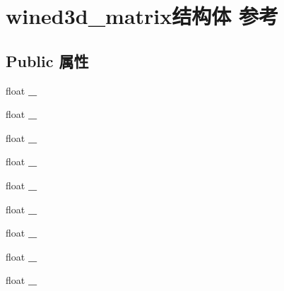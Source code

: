 \hypertarget{structwined3d__matrix}{}\section{wined3d\+\_\+matrix结构体 参考}
\label{structwined3d__matrix}
\subsection*{Public 属性}
\begin{DoxyCompactItemize}
\item 
\mbox{\label{structwined3d__matrix_a9b6db28f15d4ffe5cdcef89b510bec63}} 
float {\bfseries \+\_}
\item 
\mbox{\label{structwined3d__matrix_aa58529e4f60168eb378ae7b9ced0ca72}} 
float {\bfseries \+\_}
\item 
\mbox{\label{structwined3d__matrix_a7e3b06e4a448dbc2e14716e80b6a3eae}} 
float {\bfseries \+\_}
\item 
\mbox{\label{structwined3d__matrix_a9bc0f58263fce0222472ea60589ec08d}} 
float {\bfseries \+\_}
\item 
\mbox{\label{structwined3d__matrix_a55413661625182f5e450ce59abafdad4}} 
float {\bfseries \+\_}
\item 
\mbox{\label{structwined3d__matrix_aff1c54a97869fcd0f81d6d433db46be5}} 
float {\bfseries \+\_}
\item 
\mbox{\label{structwined3d__matrix_a06071d6fcd240d7c2929e1c8acf5dc2e}} 
float {\bfseries \+\_}
\item 
\mbox{\label{structwined3d__matrix_aa36819e1d953895713ae9f02a28fe6d1}} 
float {\bfseries \+\_}
\item 
\mbox{\label{structwined3d__matrix_a46245284d27cbab853731db3a1eb1c17}} 
float {\bfseries \+\_}
\item 
\mbox{\label{structwined3d__matrix_a806da99583574377d0866cae9d7fe936}} 

\end{DoxyCompactItemize}
